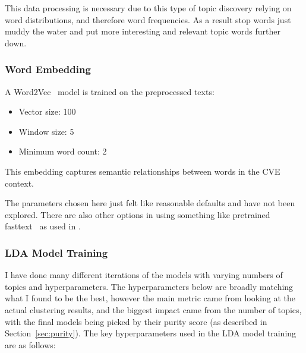 \documentclass[12pt]{article}
\begin{document}
This data processing is necessary due to this type of topic discovery relying on word distributions,
and therefore word frequencies. As a result stop words just muddy the water and put more interesting
and relevant topic words further down.

\subsubsection{Word Embedding}

A Word2Vec~\cite{word2vec} model is trained on the preprocessed texts:

\begin{itemize} \item Vector size: 100 \item Window size: 5 \item Minimum word count: 2
\end{itemize}

This embedding captures semantic relationships between words in the CVE context.

The parameters chosen here just felt like reasonable defaults and have not been explored. There are
also other options in using something like pretrained fasttext~\cite{fasttext} as used in
\cite{nvd_clustering_fasttext}.


\subsubsection{LDA Model Training}

I have done many different iterations of the models with varying numbers of topics and
hyperparameters. The hyperparameters below are broadly matching what I found to be the best,
however the main metric came from looking at the actual clustering results, and the biggest impact
came from the number of topics, with the final models being picked by their purity score (as
described in Section~\ref{sec:purity}). The key hyperparameters used in the LDA model training are
as follows:
\end{document}
